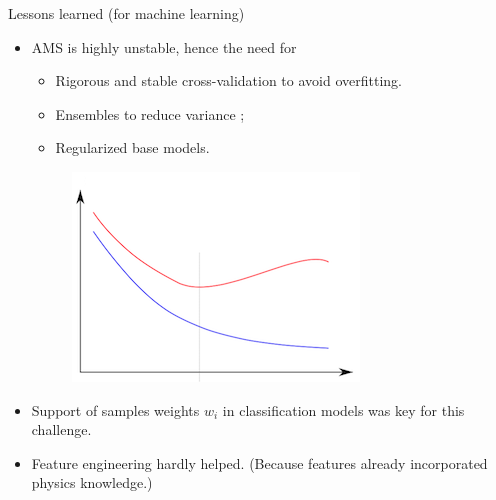 \documentclass{beamer}
\newcommand{\w}[1]{\textcolor{mygreen}{#1}}
\begin{document}

\begin{frame}{Lessons learned (for machine learning)}

\begin{itemize}
\item AMS is {\color{red} highly unstable}, hence the need for
    \begin{itemize}
        \item Rigorous and stable cross-validation to avoid overfitting.
        \item Ensembles to reduce variance ;
        \item Regularized base models.
    \end{itemize}


\begin{figure}
\includegraphics[scale=0.3]{./figures/overfitting.png}
\end{figure}

\item Support of samples weights \w{$w_i$} in classification models
      was key for this challenge.

\vspace{0.5cm}

\item Feature engineering hardly helped. (Because features already
incorporated physics knowledge.)

\end{itemize}

\end{frame}
\end{document}
